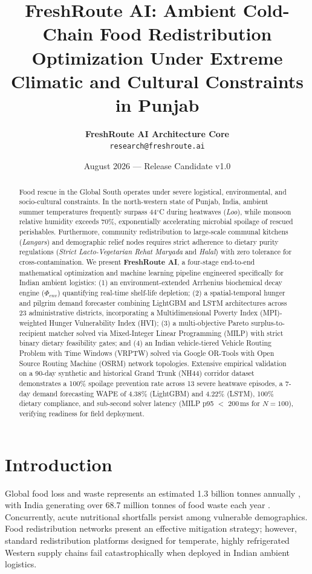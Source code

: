 \documentclass[11pt,a4paper]{article}
\title{\textbf{FreshRoute AI: Ambient Cold-Chain Food Redistribution Optimization Under Extreme Climatic and Cultural Constraints in Punjab}}
\author{
  \textbf{FreshRoute AI Architecture Core}\\
  \texttt{research@freshroute.ai}
}
\date{August 2026 --- Release Candidate v1.0}
\begin{document}
\maketitle

\begin{abstract}
Food rescue in the Global South operates under severe logistical, environmental, and socio-cultural constraints. In the north-western state of Punjab, India, ambient summer temperatures frequently surpass 44$^\circ$C during heatwaves (\textit{Loo}), while monsoon relative humidity exceeds 70\%, exponentially accelerating microbial spoilage of rescued perishables. Furthermore, community redistribution to large-scale communal kitchens (\textit{Langars}) and demographic relief nodes requires strict adherence to dietary purity regulations (\textit{Strict Lacto-Vegetarian Rehat Maryada} and \textit{Halal}) with zero tolerance for cross-contamination. 
We present \textbf{FreshRoute AI}, a four-stage end-to-end mathematical optimization and machine learning pipeline engineered specifically for Indian ambient logistics:
(1) an environment-extended Arrhenius biochemical decay engine ($\Phi_{env}$) quantifying real-time shelf-life depletion;
(2) a spatial-temporal hunger and pilgrim demand forecaster combining LightGBM and LSTM architectures across 23 administrative districts, incorporating a Multidimensional Poverty Index (MPI)-weighted Hunger Vulnerability Index (HVI);
(3) a multi-objective Pareto surplus-to-recipient matcher solved via Mixed-Integer Linear Programming (MILP) with strict binary dietary feasibility gates; and
(4) an Indian vehicle-tiered Vehicle Routing Problem with Time Windows (VRPTW) solved via Google OR-Tools with Open Source Routing Machine (OSRM) network topologies.
Extensive empirical validation on a 90-day synthetic and historical Grand Trunk (NH44) corridor dataset demonstrates a 100\% spoilage prevention rate across 13 severe heatwave episodes, a 7-day demand forecasting WAPE of 4.38\% (LightGBM) and 4.22\% (LSTM), 100\% dietary compliance, and sub-second solver latency (MILP p95 $<$ 200\,ms for $N=100$), verifying readiness for field deployment.
\end{abstract}

\section{Introduction}
Global food loss and waste represents an estimated 1.3 billion tonnes annually \cite{gustavsson2011foodloss}, with India generating over 68.7 million tonnes of food waste each year \cite{uneap2024waste}. Concurrently, acute nutritional shortfalls persist among vulnerable demographics. Food redistribution networks present an effective mitigation strategy; however, standard redistribution platforms designed for temperate, highly refrigerated Western supply chains fail catastrophically when deployed in Indian ambient logistics.
\end{document}
